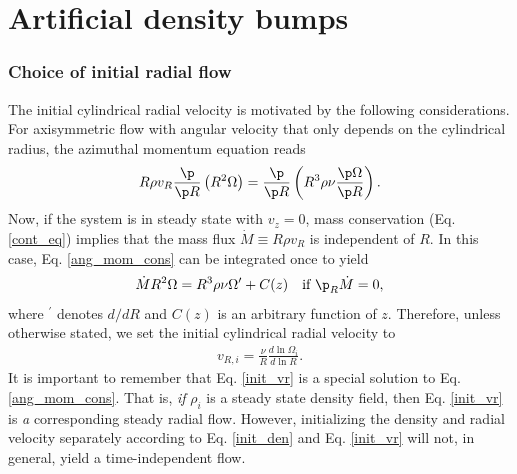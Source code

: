\section{Artificial density bumps}\label{density_bump}




\subsubsection{Choice of initial radial flow}
The initial cylindrical radial velocity is motivated by the following
considerations. For axisymmetric flow with angular velocity that only
depends on the cylindrical radius, the azimuthal momentum equation reads
\begin{align}\label{ang_mom_cons}
  R\rho v_R\frac{\p}{\p R}\left(R^2\Omega \right) = \frac{\p}{\p
    R}\left(R^3\rho\nu\frac{\p\Omega}{\p R}\right). 
\end{align}
Now, if the system is in steady state with $v_z=0$, mass
conservation (Eq. \ref{cont_eq}) implies that the mass flux  
$\dot{M}\equiv R\rho v_R$ is independent of $R$. In this case,
Eq. \ref{ang_mom_cons} can 
be integrated once to yield 
\begin{align*}
  \dot{M}R^2\Omega = R^3\rho\nu\Omega^\prime + C(z) \quad \text{if $\p_R\dot{M}$} = 0, 
\end{align*}
where $^\prime$ denotes $d/dR$ and $C(z)$ is an arbitrary function of
$z$. Therefore, unless otherwise stated, we set the initial
cylindrical radial velocity to  
\begin{align}\label{init_vr} 
  v_{R,i} = \frac{\nu}{R}\frac{d\ln{\Omega_i}}{d\ln{R}}. 
\end{align}
It is important to remember that Eq. \ref{init_vr} is a special
solution to Eq. \ref{ang_mom_cons}. That is, \emph{if} $\rho_i$ is a
steady state density field, then Eq. \ref{init_vr} is \emph{a} corresponding
steady radial flow. However, initializing the density and radial velocity
separately according to Eq. \ref{init_den} and Eq. \ref{init_vr} 
will not, in general, yield a time-independent flow. 


